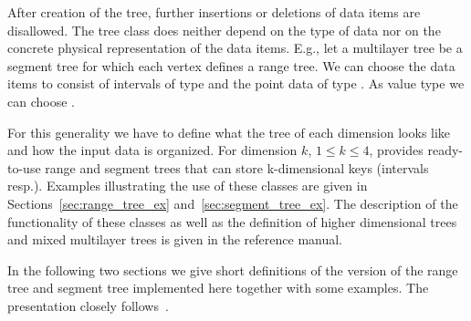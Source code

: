 After creation of the tree, further insertions or deletions of data items 
are disallowed.  
The tree class does neither depend on the type of data nor on the concrete
physical representation of the data items.
E.g., let a multilayer tree be a segment tree for which each vertex
defines a range tree. 
We can choose the data items to consist of intervals of type  
and the point data of type . 
As value type we can choose  .

For this generality we have to
define what the tree of each dimension looks like and how the
input data is organized.
For dimension $k$, $1\le k\le 4$, \cgal\/ provides ready-to-use
range and segment trees that can store k-dimensional keys
(intervals resp.). 
Examples illustrating the use of these classes are given in
Sections~\ref{sec:range_tree_ex}
and~\ref{sec:segment_tree_ex}.
The description of the functionality of these classes as well as
the definition of higher dimensional trees and mixed multilayer
trees is given in the reference manual.

In the following two sections we give short definitions of the version of
the range tree and segment tree implemented here together with some
examples. The presentation closely follows~\cite{bkos-cgaa-97}.
